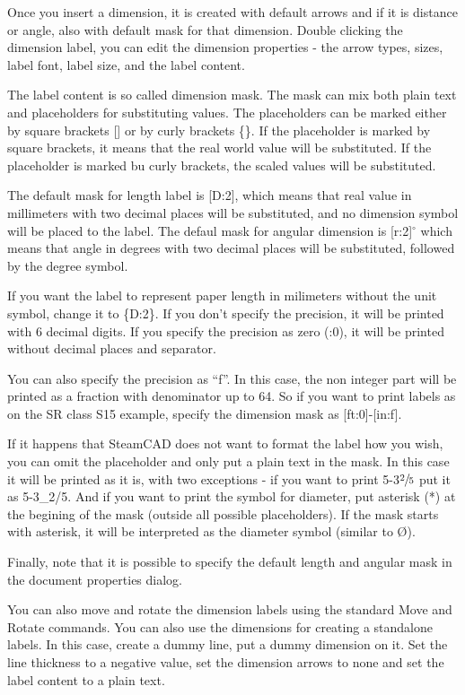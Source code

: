 Once you insert a dimension, it is created with default arrows and if it is
distance or angle, also with default mask for that dimension. Double clicking the
dimension label, you can edit the dimension properties - the arrow types, sizes,
label font, label size, and the label content.

The label content is so called dimension mask. The mask can mix both plain text
and placeholders for substituting values. The placeholders can be marked either
by square brackets [] or by curly brackets \{\}. If the placeholder is marked
by square brackets, it means that the real world value will be substituted. If
the placeholder is marked bu curly brackets, the scaled values will be substituted.

The default mask for length label is [D:2], which means that real value in millimeters
with two decimal places will be substituted, and no dimension symbol will be placed
to the label. The defaul mask for angular dimension is [r:2]$^\circ$ which means
that angle in degrees with two decimal places will be substituted, followed by the
degree symbol.

If you want the label to represent paper length in milimeters without the unit
symbol, change it to \{D:2\}. If you don't specify the precision, it will be
printed with 6 decimal digits. If you specify the precision as zero (:0), it
will be printed without decimal places and separator.

You can also specify the precision as ``f''. In this case, the non integer part
will be printed as a fraction with denominator up to 64. So if you want to print
labels as on the SR class S15 example, specify the dimension mask as
[ft:0]\primitiveApostophe{}-[in:f]\primitiveQuote{}.

If it happens that SteamCAD does not want to format the label how you wish, you
can omit the placeholder and only put a plain text in the mask. In this case
it will be printed as it is, with two exceptions - if you want to print
5\primitiveApostophe{}-3$\sfrac{2}{5}$\primitiveQuote{}
put it as 5\primitiveApostophe{}-3\_2/5\primitiveQuote{}. And if you want to print
the symbol for diameter, put asterisk (*) at the begining of the mask (outside all
possible placeholders). If the mask starts with asterisk, it will be interpreted
as the diameter symbol (similar to \O).

Finally, note that it is possible to specify the default length and angular mask
in the document properties dialog.

You can also move and rotate the dimension labels using the standard Move and
Rotate commands. You can also use the dimensions for creating a standalone
labels. In this case, create a dummy line, put a dummy dimension on it. Set
the line thickness to a negative value, set the dimension arrows to none and
set the label content to a plain text.

